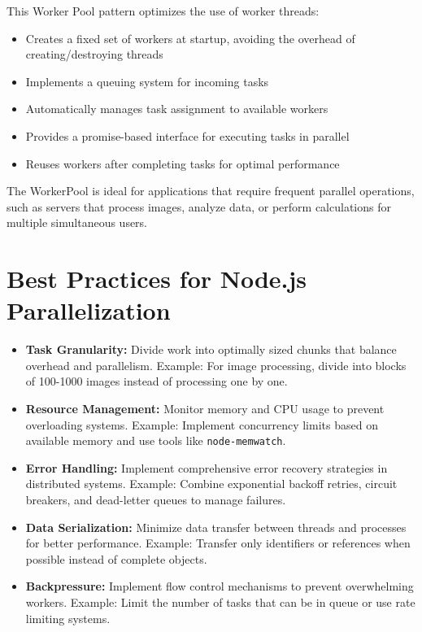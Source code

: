 \documentclass[12pt,letterpaper]{article}
\begin{document}
This Worker Pool pattern optimizes the use of worker threads:
\begin{itemize}
    \item Creates a fixed set of workers at startup, avoiding the overhead of creating/destroying threads
    \item Implements a queuing system for incoming tasks
    \item Automatically manages task assignment to available workers
    \item Provides a promise-based interface for executing tasks in parallel
    \item Reuses workers after completing tasks for optimal performance
\end{itemize}

The WorkerPool is ideal for applications that require frequent parallel operations, such as servers that process images, analyze data, or perform calculations for multiple simultaneous users.

\section{Best Practices for Node.js Parallelization}

\begin{itemize}
    \item \textbf{\textcolor{accentColor}{Task Granularity:}} Divide work into optimally sized chunks that balance overhead and parallelism.
    Example: For image processing, divide into blocks of 100-1000 images instead of processing one by one.
    
    \item \textbf{\textcolor{accentColor}{Resource Management:}} Monitor memory and CPU usage to prevent overloading systems.
    Example: Implement concurrency limits based on available memory and use tools like \texttt{node-memwatch}.
    
    \item \textbf{\textcolor{accentColor}{Error Handling:}} Implement comprehensive error recovery strategies in distributed systems.
    Example: Combine exponential backoff retries, circuit breakers, and dead-letter queues to manage failures.
    
    \item \textbf{\textcolor{accentColor}{Data Serialization:}} Minimize data transfer between threads and processes for better performance.
    Example: Transfer only identifiers or references when possible instead of complete objects.
    
    \item \textbf{\textcolor{accentColor}{Backpressure:}} Implement flow control mechanisms to prevent overwhelming workers.
    Example: Limit the number of tasks that can be in queue or use rate limiting systems.
\end{itemize}
\end{document}
